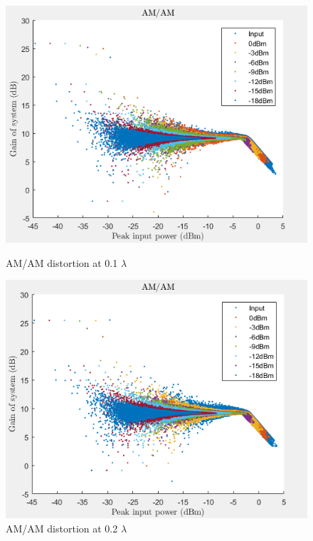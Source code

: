 \begin{figure}[H]
  \centering
  \begin{minipage}[b]{0.5\textwidth}
	\includegraphics[scale = 0.5]{figures/measurement/two_antenna/amam_01.png}
	\caption{AM/AM distortion at 0.1 $\lambda$}
    \label{fig:amam01}
  \end{minipage}
  \hfill
  \begin{minipage}[b]{0.4\textwidth}
\includegraphics[scale = 0.5]{figures/measurement/two_antenna/amam_02.png}
\caption{AM/AM distortion at 0.2 $\lambda$}
    \label{fig:amam02}
  \end{minipage}
\end{figure}

